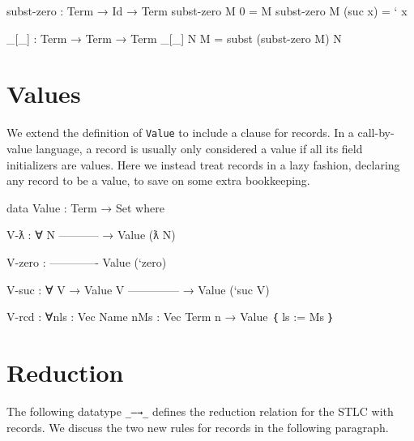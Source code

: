 \begin{fence}
\begin{code}
subst-zero : Term → Id → Term
subst-zero M 0       =  M
subst-zero M (suc x) =  ` x

_[_] : Term → Term → Term
_[_] N M =  subst (subst-zero M) N
\end{code}
\end{fence}

\hypertarget{values}{%
\section{Values}\label{values}}

We extend the definition of \texttt{Value} to include a clause for
records. In a call-by-value language, a record is usually only
considered a value if all its field initializers are values. Here we
instead treat records in a lazy fashion, declaring any record to be a
value, to save on some extra bookkeeping.

\begin{fence}
\begin{code}
data Value : Term → Set where

  V-ƛ : ∀ {N}
      -----------
    → Value (ƛ N)

  V-zero :
      -------------
      Value (`zero)

  V-suc : ∀ {V}
    → Value V
      --------------
    → Value (`suc V)

  V-rcd : ∀{n}{ls : Vec Name n}{Ms : Vec Term n}
    → Value ｛ ls := Ms ｝
\end{code}
\end{fence}

\hypertarget{reduction}{%
\section{Reduction}\label{reduction}}

The following datatype \texttt{\_—→\_} defines the reduction relation
for the STLC with records. We discuss the two new rules for records in
the following paragraph.

